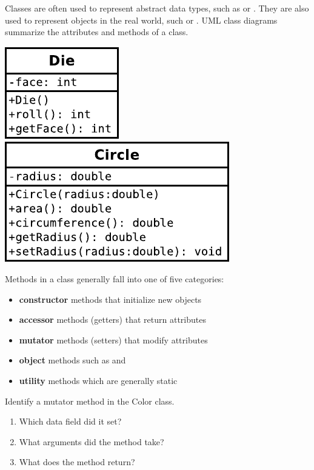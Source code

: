 

Classes are often used to represent abstract data types, such as  or .
They are also used to represent objects in the real world, such  or .
UML class diagrams summarize the attributes and methods of a class.

\begin{center}
\includegraphics{CS1/Die.pdf}
\includegraphics{CS1/Circle.pdf}
\end{center}

Methods in a class generally fall into one of five categories:
\begin{itemize}[itemsep=0pt]
\item \textbf{constructor} methods that initialize new objects
\item \textbf{accessor} methods (getters) that return attributes
\item \textbf{mutator} methods (setters) that modify attributes
\item \textbf{object} methods such as  and 
\item \textbf{utility} methods which are generally static
\end{itemize}




\Q Identify a mutator method in the Color class.
\begin{enumerate}
\item Which data field did it set?
\item What arguments did the method take?
\item What does the method return?
\end{enumerate}


